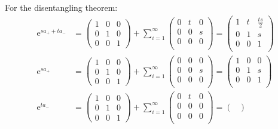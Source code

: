 \documentclass[]{ctexart}
\newcommand{\me}{\mathrm{e}}
\begin{document}
		For the disentangling theorem:
			\begin{equation*}
			\begin{aligned}
				\me ^{sa_++ta_-}&=
				\begin{pmatrix}
					1 & 0 &  0 \\
					0 & 1 &  0\\
					0 & 0 & 1
				\end{pmatrix}
				+\sum_{i=1}^{\infty}
				\begin{pmatrix}
				0 &  t & 0 \\
				0 & 0 & s \\
				0 & 0 & 0 \\
				\end{pmatrix}
				=
				\begin{pmatrix}
				1 &  t & \frac{ts}{2} \\
				0 & 1 & s \\
				0 & 0 & 1 \\
				\end{pmatrix}\\
				\me ^{sa_+}&=
				\begin{pmatrix}
				1 & 0 &  0 \\
				0 & 1 &  0\\
				0 & 0 & 1
				\end{pmatrix}
				+\sum_{i=1}^{\infty}
				\begin{pmatrix}
				0 & 0 & 0 \\
				0 & 0 & s \\
				0 & 0 & 0 \\
				\end{pmatrix}
				=
				\begin{pmatrix}
				1 &  0 & 0 \\
				0 & 1 & s \\
				0 & 0 & 1 \\
				\end{pmatrix}\\
				\me ^{ta_-}&=
				\begin{pmatrix}
				1 & 0 &  0 \\
				0 & 1 &  0\\
				0 & 0 & 1
				\end{pmatrix}
				+\sum_{i=1}^{\infty}
				\begin{pmatrix}
				0 &  t & 0 \\
				0 & 0 & 0 \\
				0 & 0 & 0 \\
				\end{pmatrix}
				=
				\begin{pmatrix}

\end{pmatrix}
\end{aligned}
\end{equation*}
\end{document}
